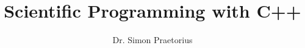 \documentclass[10pt,a4paper]{report}
\author{Dr. Simon Praetorius}
\title{Scientific Programming with C++}
\begin{document}
\maketitle
\tableofcontents



\todos

\printindex



\end{document}

